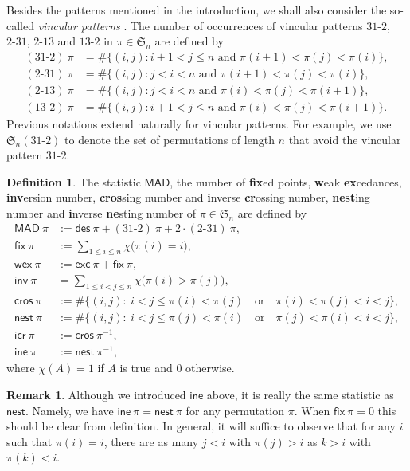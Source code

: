 \documentclass[12pt,reqno]{amsart}
\numberwithin{equation}{section}
\theoremstyle{plain}
\theoremstyle{definition}
\newtheorem{Def}[theorem]{Definition}
\newtheorem{remark}[theorem]{Remark}
\def\S{\mathfrak{S}}
\def\exc{\mathsf{exc}}
\def\des{\mathsf{des}}
\def\inv{\mathsf{inv}}
\def\fix{\mathsf{fix}}
\def\nest{\mathsf{nest}}
\def\cros{\mathsf{cros}}
\def\icr{\mathsf{icr}}
\def\ine{\mathsf{ine}}
\def\wex{\mathsf{wex}}
\def\MAD{\mathsf{MAD}}
\def\cab{31\text{-}2}
\def\bca{2\text{-}31}
\def\acb{13\text{-}2}
\def\bac{2\text{-}13}
\begin{document}
Besides the patterns mentioned in the introduction, we shall also consider the so-called \emph{vincular patterns} \cite{BS}. The number of occurrences of vincular patterns $\cab$, $\bca$, $\bac$ and $\acb$ in $\pi\in \S_n$ are defined by
\begin{align*}
(\cab)\:\pi&=\#\{(i,j):  i+1<j\le n \text{ and } \pi(i+1)<\pi(j)<\pi(i)\},\\
(\bca)\:\pi&=\#\{(i,j):  j<i<n \text{ and } \pi(i+1)<\pi(j)<\pi(i)\},\\
(\bac)\:\pi&=\#\{(i,j): j<i<n \text{ and } \pi(i)<\pi(j)<\pi(i+1) \},\\
(\acb)\:\pi&=\#\{(i,j): i+1<j\le n \text{ and } \pi(i)<\pi(j)<\pi(i+1) \}.
\end{align*}
Previous notations extend naturally for vincular patterns. For example, we use $\S_n(\cab)$ to denote the set of permutations of length $n$ that avoid the vincular pattern $\cab$.
\begin{Def}
The statistic $\MAD$, the number of {\bf fix}ed points, {\bf w}eak {\bf ex}cedances, {\bf inv}ersion number, {\bf cros}sing number and {\bf i}nverse {\bf cr}ossing number, {\bf nest}ing number and {\bf i}nverse {\bf ne}sting number of $\pi\in\S_n$ are defined by
\begin{align*}
\MAD\:\pi &:=\des\:\pi+(\cab)\:\pi+2\cdot(\bca)\:\pi,\\
\fix\:\pi &:=\sum_{1\leq i\leq n}\chi\Big(\pi(i)=i\Big),\\
\wex\:\pi &:=\exc\:\pi+\fix\:\pi,\\
\inv\:\pi &=\sum_{1\leq i<j\leq n}\chi\Big(\pi(i)>\pi(j)\Big),\\
\cros\:\pi &:=\#\{(i,j):\:i<j\leq\pi(i)<\pi(j)\quad\textrm{or}\quad\pi(i)<\pi(j)<i<j\},\\
\nest\:\pi &:=\#\{(i,j):\:i<j\leq\pi(j)<\pi(i)\quad\textrm{or}\quad\pi(j)<\pi(i)<i<j\},\\
\icr\:\pi &:=\cros\:\pi^{-1},\\
\ine\:\pi &:=\nest\:\pi^{-1},
\end{align*}
where $\chi(A)=1$ if $A$ is true and 0 otherwise.
\end{Def}
\begin{remark}
Although we introduced $\ine$ above, it is really the same statistic as $\nest$. Namely, we have $\ine\:\pi=\nest\:\pi$ for any permutation $\pi$. When $\fix\:\pi=0$ this should be clear from definition. In general, it will suffice to observe that for any $i$ such that $\pi(i)=i$, there are as many $j<i$ with $\pi(j)>i$ as $k>i$ with $\pi(k)<i$.
\end{remark}
\end{document}
